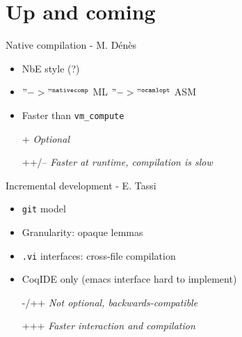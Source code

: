 \section{Up and coming}
\begin{subsecframe}{Native compilation - M. Dénès}
\begin{itemize}
\item NbE style (?)
\item \Coq $"->"^{\texttt{nativecomp}}$ \textsc{ML} $"->"^{\texttt{ocamlopt}}$ \textsc{ASM}
\item Faster than \texttt{vm\_compute}
\end{itemize}

  \begin{itemize}
  \item[+] \emph{Optional}
  \item[++/--] \emph{Faster at runtime, compilation is slow}
  \end{itemize}
\end{subsecframe}

\begin{subsecframe}{Incremental development - E. Tassi}
  \begin{itemize}
  \item \texttt{git} model
  \item Granularity: opaque lemmas
  \item \texttt{.vi} interfaces: cross-file compilation
  \item CoqIDE only (emacs interface hard to implement)
  \end{itemize}

  \begin{itemize}
  \item[-/++] \emph{Not optional, backwards-compatible}
  \item[+++] \emph{Faster interaction and compilation}
  \end{itemize}
\end{subsecframe}


